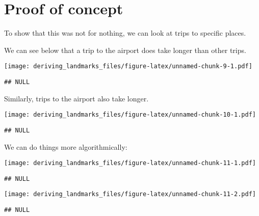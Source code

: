 \documentclass[]{article}
\begin{document}
\hypertarget{proof-of-concept}{%
\section{Proof of concept}\label{proof-of-concept}}

To show that this was not for nothing, we can look at trips to specific
places.

We can see below that a trip to the airport does take longer than other
trips.

\texttt{[image: deriving\_landmarks\_files/figure-latex/unnamed-chunk-9-1.pdf]}

\begin{verbatim}
## NULL
\end{verbatim}

Similarly, trips to the airport also take longer.

\texttt{[image: deriving\_landmarks\_files/figure-latex/unnamed-chunk-10-1.pdf]}

\begin{verbatim}
## NULL
\end{verbatim}

We can do things more algorithmically:

\texttt{[image: deriving\_landmarks\_files/figure-latex/unnamed-chunk-11-1.pdf]}

\begin{verbatim}
## NULL
\end{verbatim}

\texttt{[image: deriving\_landmarks\_files/figure-latex/unnamed-chunk-11-2.pdf]}

\begin{verbatim}
## NULL
\end{verbatim}
\end{document}
